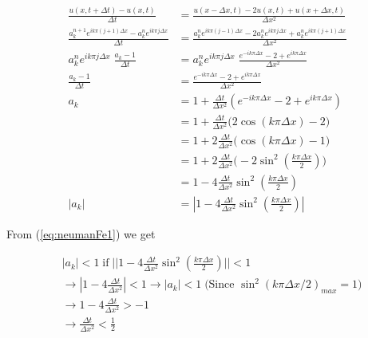 \documentclass{article}
\begin{document}
\begin{subequations}\label{eq:naumanFe0}
	\begin{align}
		\frac{u(x, t+ \Delta t) - u(x,t)}{\Delta t}  &= 
		\frac{u(x - \Delta x, t) - 2u(x,t) + u(x+ \Delta x, t)}{\Delta x^2} \\
		\frac{a_k^{n+1} e^{i k \pi (j+1) \Delta x} - a_k^n e^{i k \pi j \Delta x}}{\Delta t}  &= 
		\frac{a_k^{n} e^{i k \pi (j-1) \Delta x} - 2a_k^{n} e^{i k \pi j \Delta x} + a_k^{n} e^{i k \pi (j+1) \Delta x}}{\Delta x^2} \\
		a_k^{n} e^{i k \pi j \Delta x}\; \frac{a_k  -1}{\Delta t}  &= 
		a_k^{n} e^{i k \pi j \Delta x}\; \frac{ e^{-i k \pi \Delta x} - 2  +  e^{i k \pi  \Delta x}}{\Delta x^2} \\
		 \frac{a_k  -1}{\Delta t}  &= 
		 \frac{ e^{-i k \pi \Delta x} - 2  +  e^{i k \pi  \Delta x}}{\Delta x^2} \\
		 a_k &= 1 + \frac{\Delta t}{\Delta x^2} (e^{-i k \pi \Delta x} - 2  +  e^{i k \pi  \Delta x})\\
		 &= 1+ \frac{\Delta t}{\Delta x^2} \Big(2 \cos(k\pi\Delta x) - 2\Big)\\
		 &= 1+ 2\frac{\Delta t}{\Delta x^2} \Big( \cos(k\pi\Delta x) - 1\Big)\\
		 &= 1+ 2\frac{\Delta t}{\Delta x^2} \Big(- 2 \sin^2(\frac{k\pi\Delta x}{2}) \Big)\\
		 &=1 - 4\frac{\Delta t}{\Delta x^2} \sin^2(\frac{k\pi\Delta x}{2}) \\
		 |a_k| &= |1 - 4\frac{\Delta t}{\Delta x^2} \sin^2(\frac{k\pi\Delta x}{2})|\label{eq:neumanFe1}
	\end{align}
\end{subequations}

From (\ref{eq:neumanFe1}) we get
 
\begin{subequations}
	\begin{align}
		 &|a_k| < 1\; \text{if}\; ||1 - 4\frac{\Delta t}{\Delta x^2} \sin^2(\frac{k\pi\Delta x}{2})|| < 1 \\
		 &\rightarrow |1 - 4 \frac{\Delta t}{\Delta x^2}| < 1 \rightarrow |a_k| < 1\;\text{(Since $\sin^2(k \pi \Delta x/2)_{max}  = 1$)}\\
		 &\rightarrow 1 - 4 \frac{\Delta t}{\Delta x^2} > -1\\ 
		 &\rightarrow \frac{\Delta t}{\Delta x^2} < \frac{1}{2}\label{eq:neumanFe2}
	\end{align}
\end{subequations}
\end{document}
